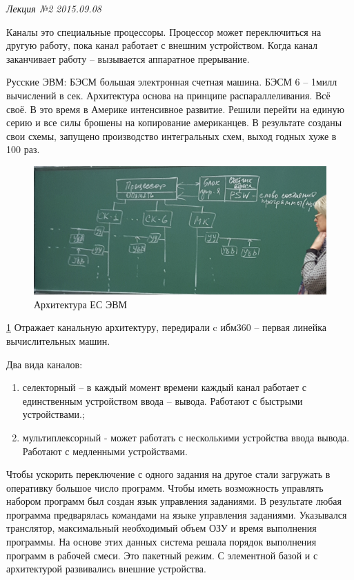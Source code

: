 \clearpage
\begin{flushright}
	\textit{Лекция №2}
	\textit{2015.09.08}
\end{flushright}

Каналы это специальные процессоры. Процессор может переключиться на другую работу, пока канал работает с внешним устройством. Когда канал заканчивает работу – вызывается аппаратное прерывание. 

Русские ЭВМ: БЭСМ большая электронная счетная машина. БЭСМ 6 – 1милл вычислений в сек. Архитектура основа на принципе распараллеливания. Всё своё. В это время в Америке интенсивное развитие. Решили перейти на единую серию и все силы брошены на копирование американцев. В результате созданы свои схемы, запущено производство интегральных схем, выход годных хуже в 100 раз.

\begin{figure}[H]
  \centering
  \includegraphics[width=\textwidth]{pic/1.png}
  \caption{Архитектура ЕС ЭВМ}
  \label{pic:es_evm}
\end{figure}

\ref{pic:es_evm} Отражает канальную архитектуру, передирали c ибм360 – первая линейка вычислительных машин.

Два вида каналов:
\begin{enumerate}
\item селекторный – в каждый момент времени каждый канал работает с единственным устройством ввода – вывода. Работают с быстрыми устройствами.;
\item мультиплексорный - может работать с несколькими устройства ввода вывода. Работают с медленными устройствами.
\end{enumerate}

Чтобы ускорить переключение с одного задания на другое стали загружать в оперативку большое число программ. Чтобы иметь возможность управлять набором программ был создан язык управления заданиями. В результате любая программа предварялась командами на языке управления заданиями. Указывался транслятор, максимальный необходимый объем ОЗУ и время выполнения программы. На основе этих данных система решала порядок выполнения программ в рабочей смеси. Это пакетный режим. С элементной базой и с архитектурой развивались внешние устройства.  

